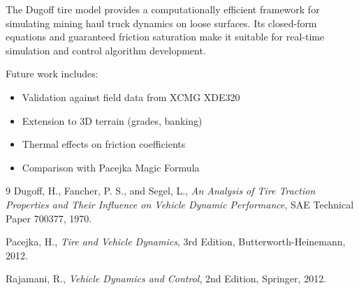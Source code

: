 \documentclass[11pt,a4paper]{article}
\begin{document}
The Dugoff tire model provides a computationally efficient framework for simulating mining haul truck dynamics on loose surfaces. Its closed-form equations and guaranteed friction saturation make it suitable for real-time simulation and control algorithm development.

Future work includes:
\begin{itemize}
    \item Validation against field data from XCMG XDE320
    \item Extension to 3D terrain (grades, banking)
    \item Thermal effects on friction coefficients
    \item Comparison with Pacejka Magic Formula
\end{itemize}

\begin{thebibliography}{9}
Dugoff, H., Fancher, P. S., and Segel, L.,
\textit{An Analysis of Tire Traction Properties and Their Influence on Vehicle Dynamic Performance},
SAE Technical Paper 700377, 1970.

Pacejka, H.,
\textit{Tire and Vehicle Dynamics}, 3rd Edition,
Butterworth-Heinemann, 2012.

Rajamani, R.,
\textit{Vehicle Dynamics and Control}, 2nd Edition,
Springer, 2012.
\end{thebibliography}
\end{document}

